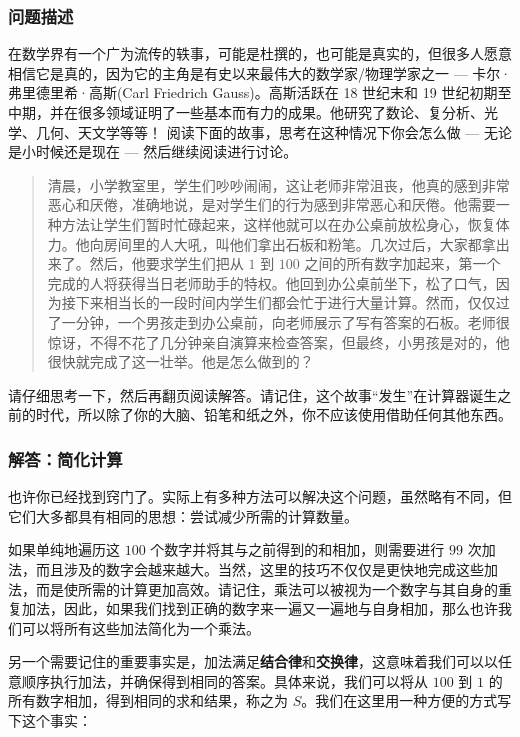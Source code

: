\subsubsection*{问题描述}

在数学界有一个广为流传的轶事，可能是杜撰的，也可能是真实的，但很多人愿意相信它是真的，因为它的主角是有史以来最伟大的数学家/物理学家之一 --- 卡尔·弗里德里希·高斯(Carl Friedrich Gauss)。高斯活跃在 18 世纪末和 19 世纪初期至中期，并在很多领域证明了一些基本而有力的成果。他研究了数论、复分析、光学、几何、天文学等等！ 阅读下面的故事，思考在这种情况下你会怎么做 --- 无论是小时候还是现在 --- 然后继续阅读进行讨论。

\begin{quote}
    清晨，小学教室里，学生们吵吵闹闹，这让老师非常沮丧，他真的感到非常恶心和厌倦，准确地说，是对学生们的行为感到非常恶心和厌倦。他需要一种方法让学生们暂时忙碌起来，这样他就可以在办公桌前放松身心，恢复体力。他向房间里的人大吼，叫他们拿出石板和粉笔。几次过后，大家都拿出来了。然后，他要求学生们把从 $1$ 到 $100$ 之间的所有数字加起来，第一个完成的人将获得当日老师助手的特权。他回到办公桌前坐下，松了口气，因为接下来相当长的一段时间内学生们都会忙于进行大量计算。然而，仅仅过了一分钟，一个男孩走到办公桌前，向老师展示了写有答案的石板。老师很惊讶，不得不花了几分钟亲自演算来检查答案，但最终，小男孩是对的，他很快就完成了这一壮举。他是怎么做到的？
\end{quote}

请仔细思考一下，然后再翻页阅读解答。请记住，这个故事``发生''在计算器诞生之前的时代，所以除了你的大脑、铅笔和纸之外，你不应该使用借助任何其他东西。

\clearpage

\subsubsection*{解答：简化计算}

也许你已经找到窍门了。实际上有多种方法可以解决这个问题，虽然略有不同，但它们大多都具有相同的思想：尝试减少所需的计算数量。

如果单纯地遍历这 $100$ 个数字并将其与之前得到的和相加，则需要进行 $99$ 次加法，而且涉及的数字会越来越大。当然，这里的技巧不仅仅是更快地完成这些加法，而是使所需的计算更加高效。请记住，乘法可以被视为一个数字与其自身的重复加法，因此，如果我们找到正确的数字来一遍又一遍地与自身相加，那么也许我们可以将所有这些加法简化为一个乘法。

另一个需要记住的重要事实是，加法满足\textbf{结合律}和\textbf{交换律}，这意味着我们可以以任意顺序执行加法，并确保得到相同的答案。具体来说，我们可以将从 $100$ 到 $1$ 的所有数字相加，得到相同的求和结果，称之为 $S$。我们在这里用一种方便的方式写下这个事实：

